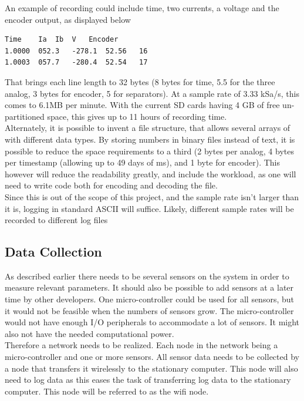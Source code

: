 An example of recording could include time, two currents, a voltage and the encoder output, as displayed below
\begin{lstlisting}
Time	Ia	Ib	V	Encoder
1.0000	052.3	-278.1	52.56	16
1.0003	057.7	-280.4	52.54	17
\end{lstlisting}
That brings each line length to 32 bytes (8 bytes for time, 5.5 for the three analog, 3 bytes for encoder, 5 for separators).
At a sample rate of 3.33 kSa/s, this comes to 6.1MB per minute. 
With the current SD cards having 4 GB of free un-partitioned space, this gives up to 11 hours of recording time.\\

Alternately, it is possible to invent a file structure, that allows several arrays of with different data types.
By storing numbers in binary files instead of text, it is possible to reduce the space requirements to a third (2 bytes per analog, 4 bytes per timestamp (allowing up to 49 days of ms), and 1 byte for encoder).
This however will reduce the readability greatly, and include the workload, as one will need to write code both for encoding and decoding the file. \\

Since this is out of the scope of this project, and the sample rate isn't larger than it is, logging in standard ASCII will suffice.
Likely, different sample rates will be recorded to different log files









\subsection{Data Collection}
\label{sec:data_collection}
As described earlier there needs to be several sensors on the system in order to measure relevant parameters.
It should also be possible to add sensors at a later time by other developers. 
One micro-controller could be used for all sensors, but it would not be feasible when the numbers of sensors grow. 
The micro-controller would not have enough I/O peripherals to accommodate a lot of sensors. 
It might also not have the needed computational power. 
\\
Therefore a network needs to be realized. Each node in the network being a micro-controller and one or more sensors.
All sensor data needs to be collected by a node that transfers it wirelessly to the stationary computer.
This node will also need to log data as this eases the task of transferring log data to the stationary computer.
This node will be referred to as the wifi node.

